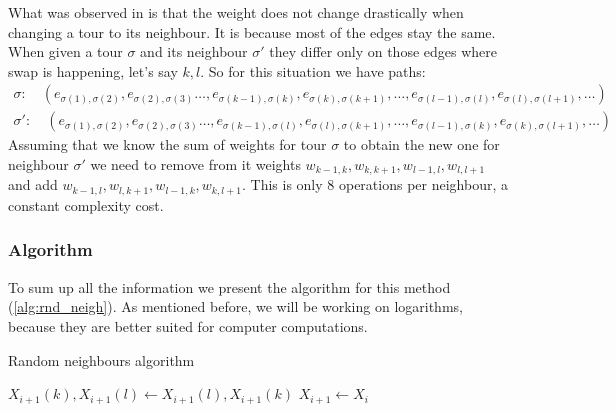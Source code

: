 		What was observed in \cite{decryption_tsp_MCMC} is that the weight does not change drastically when changing a tour to its neighbour. It is because most of the edges stay the same. When given a tour $\sigma$ and its neighbour $\sigma'$ they differ only on those edges where swap is happening, let's say $k,l$. So for this situation we have paths:
		\begin{align*}
			\sigma: \quad (e_{\sigma(1), \sigma(2)}, e_{\sigma(2), \sigma(3)} \ldots, e_{\sigma(k-1), \sigma(k)}, e_{\sigma(k), \sigma(k+1)}, \ldots, e_{\sigma(l-1), \sigma(l)}, e_{\sigma(l), \sigma(l+1)}, \ldots) \\
			\sigma': \quad(e_{\sigma(1), \sigma(2)}, e_{\sigma(2), \sigma(3)} \ldots, e_{\sigma(k-1), \sigma(l)}, e_{\sigma(l), \sigma(k+1)}, \ldots, e_{\sigma(l-1), \sigma(k)}, e_{\sigma(k), \sigma(l+1)}, \ldots)
		\end{align*}
		Assuming that we know the sum of weights for tour $\sigma$ to obtain the new one for neighbour $\sigma'$ we need to remove from it weights $w_{k-1, k}, w_{k, k+1}, w_{l-1, l}, w_{l, l+1}$ and add $w_{k-1, l}, w_{l, k+1}, w_{l-1, k}, w_{k, l+1}$. This is only $8$ operations per neighbour, a constant complexity cost.
		
	\subsubsection{Algorithm}
		To sum up all the information we present the algorithm for this method (\ref{alg:rnd_neigh}). As mentioned before, we will be working on logarithms, because they are better suited for computer computations.
		
		\begin{algorithm}
			\caption{Random neighbours algorithm}\label{alg:rnd_neigh}
			\begin{algorithmic}[1]
				
				\State $X_{i+1}(k), X_{i+1}(l) \gets X_{i+1}(l), X_{i+1}(k)$
				\Else
				\State $X_{i+1} \gets X_i$
				\EndIf
				\EndFor
			\end{algorithmic}
		\end{algorithm}

